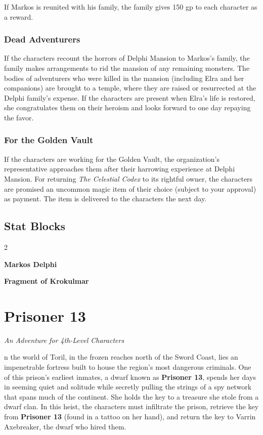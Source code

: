 \documentclass[10pt,a4paper,twoside,bg=print,twocolumn,openany,nodeprecatedcode]{dndbook}
\begin{document}
If Markos is reunited with his family, the family gives 150 gp to each character as a reward.

\subsection{Dead Adventurers}
If the characters recount the horrors of Delphi Mansion to Markos's family, the family makes arrangements to rid the mansion of any remaining monsters. The bodies of adventurers who were killed in the mansion (including Elra and her companions) are brought to a temple, where they are raised or resurrected at the Delphi family's expense. If the characters are present when Elra's life is restored, she congratulates them on their heroism and looks forward to one day repaying the favor.

\subsection{For the Golden Vault}
If the characters are working for the Golden Vault, the organization's representative approaches them after their harrowing experience at Delphi Mansion. For returning \textit{The Celestial Codex} to its rightful owner, the characters are promised an uncommon magic item of their choice (subject to your approval) as payment. The item is delivered to the characters the next day.

\section{Stat Blocks}

\begin{itemize}
\begin{multicols}{2}
\item \textbf{Markos Delphi}
\item \textbf{Fragment of Krokulmar}
\end{multicols}

\end{itemize}

\chapter{Prisoner 13}
\textit{An Adventure for 4th-Level Characters}

n the world of Toril, in the frozen reaches north of the Sword Coast, lies an impenetrable fortress built to house the region's most dangerous criminals. One of this prison's earliest inmates, a dwarf known as \textbf{Prisoner 13}, spends her days in seeming quiet and solitude while secretly pulling the strings of a spy network that spans much of the continent. She holds the key to a treasure she stole from a dwarf clan. In this heist, the characters must infiltrate the prison, retrieve the key from \textbf{Prisoner 13} (found in a tattoo on her hand), and return the key to Varrin Axebreaker, the dwarf who hired them.
\end{document}
